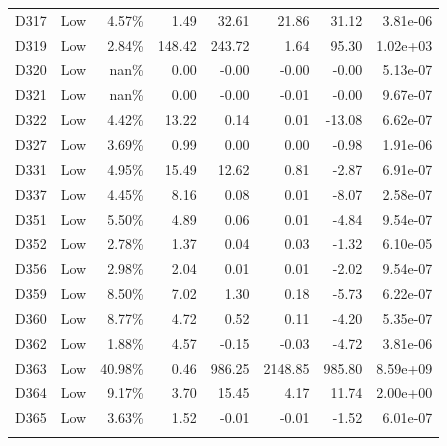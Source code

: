 \begin{tabular}{l l r r r r r r}
D317 & Low & 4.57\% & 1.49 & 32.61 & 21.86 & 31.12 & 3.81e-06 \\
D319 & Low & 2.84\% & 148.42 & 243.72 & 1.64 & 95.30 & 1.02e+03 \\
D320 & Low & nan\% & 0.00 & -0.00 & -0.00 & -0.00 & 5.13e-07 \\
D321 & Low & nan\% & 0.00 & -0.00 & -0.01 & -0.00 & 9.67e-07 \\
D322 & Low & 4.42\% & 13.22 & 0.14 & 0.01 & -13.08 & 6.62e-07 \\
D327 & Low & 3.69\% & 0.99 & 0.00 & 0.00 & -0.98 & 1.91e-06 \\
D331 & Low & 4.95\% & 15.49 & 12.62 & 0.81 & -2.87 & 6.91e-07 \\
D337 & Low & 4.45\% & 8.16 & 0.08 & 0.01 & -8.07 & 2.58e-07 \\
D351 & Low & 5.50\% & 4.89 & 0.06 & 0.01 & -4.84 & 9.54e-07 \\
D352 & Low & 2.78\% & 1.37 & 0.04 & 0.03 & -1.32 & 6.10e-05 \\
D356 & Low & 2.98\% & 2.04 & 0.01 & 0.01 & -2.02 & 9.54e-07 \\
D359 & Low & 8.50\% & 7.02 & 1.30 & 0.18 & -5.73 & 6.22e-07 \\
D360 & Low & 8.77\% & 4.72 & 0.52 & 0.11 & -4.20 & 5.35e-07 \\
D362 & Low & 1.88\% & 4.57 & -0.15 & -0.03 & -4.72 & 3.81e-06 \\
D363 & Low & 40.98\% & 0.46 & 986.25 & 2148.85 & 985.80 & 8.59e+09 \\
D364 & Low & 9.17\% & 3.70 & 15.45 & 4.17 & 11.74 & 2.00e+00 \\
D365 & Low & 3.63\% & 1.52 & -0.01 & -0.01 & -1.52 & 6.01e-07 \\
\noalign{\smallskip}\hline
\end{tabular}